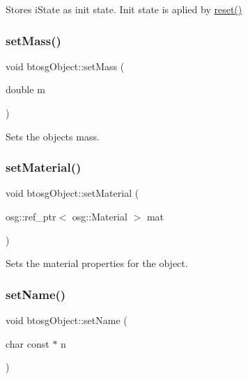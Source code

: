 Stores i\+State as init state. Init state is aplied by \hyperlink{classbtosgObject_a93983f9180dd0672f8779cf2baa78580}{reset()} \mbox{\label{classbtosgObject_a91da93c82d48b86192f0cbb16054fe57}} 
\subsubsection{\texorpdfstring{set\+Mass()}{setMass()}}
{\footnotesize\ttfamily void btosg\+Object\+::set\+Mass (\begin{DoxyParamCaption}\item[{double}]{m }\end{DoxyParamCaption})\hspace{0.3cm}{\ttfamily [inline]}}

Sets the object\textquotesingle{}s mass. \mbox{\label{classbtosgObject_a6ab7b9e0553dab398b980637788b56a8}} 
\subsubsection{\texorpdfstring{set\+Material()}{setMaterial()}}
{\footnotesize\ttfamily void btosg\+Object\+::set\+Material (\begin{DoxyParamCaption}\item[{osg\+::ref\+\_\+ptr$<$ osg\+::\+Material $>$}]{mat }\end{DoxyParamCaption})\hspace{0.3cm}{\ttfamily [inline]}}

Sets the material properties for the object. \mbox{\label{classbtosgObject_ab06a1b3f357209214c6440cd5746523e}} 
\subsubsection{\texorpdfstring{set\+Name()}{setName()}}
{\footnotesize\ttfamily void btosg\+Object\+::set\+Name (\begin{DoxyParamCaption}\item[{char const $\ast$}]{n }\end{DoxyParamCaption})\hspace{0.3cm}{\ttfamily [inline]}}

